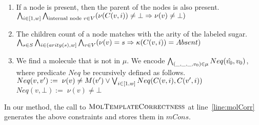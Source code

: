 \begin{enumerate}
\item If a node is present, then the parent of the nodes is also present.\\
  $
  \bigwedge_{i\in[1,w]}\bigwedge_{{\text{internal node } v \in V}} (\nu(C(v,i) ) \neq \bot \Rightarrow \nu( v ) \neq \bot )  
  $
\item The children count of a node matches with the arity of the labeled sugar.\\
  $
  \bigwedge_{s \in S} \bigwedge_{i \in (arity(s),w] }\bigwedge_{v \in V} (\nu(v) = s \Rightarrow \kappa( C(v,i) ) = Absent )
  $
\item We find a molecule that is not in $\mu$.
  We encode $\bigwedge_{{(\_,\_,\_, v_0)\in \mu}}  Neq(\hat{v_0},v_0)$, where
   predicate $Neq$ be recursively defined as follows.\\
  $Neq(v, v') :=\; \nu(v) \neq M(v') \lor
  \bigvee_{{i \in [1,w]}} Neq( C(v,i), C(v',i ) )$\\
  $Neq(v,\bot) :=\;  \nu(v) \neq \bot$
\end{enumerate}
%
In our method, the call to $\textsc{MolTemplateCorrectness}$ at
line~\ref{line:molCorr} generates the above constraints and stores them in
$mCons$. 

